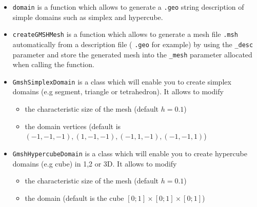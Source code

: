 \begin{itemize}
\item \lstinline!domain! is a function which allows to generate a \verb|.geo|
  string description of simple domains such as simplex and hypercube.

\item \lstinline!createGMSHMesh! is a function which allows to generate a mesh
  file \verb|.msh| automatically from a description file ( \verb|.geo| for
  example) by using the \verb|_desc| parameter and store the generated mesh into
  the \verb|_mesh| parameter allocated when calling the function.

\item \lstinline!GmshSimplexDomain! is a class which will enable you to create
  simplex domains (e.g segment, triangle or tetrahedron). It allows to modify
  	\begin{itemize}
	 \item the characteristic size of the mesh (default $h=0.1$)
  	\item the domain vertices (default is $(-1,-1,-1), (1,-1,-1), (-1,1,-1), (-1,-1,1)$)
  	\end{itemize}

\item \lstinline!GmshHypercubeDomain! is a class which will enable you to create hypercube domains (e.g cube) in 1,2 or 3D. It allows to modify
  	\begin{itemize}
  	\item the characteristic size of the mesh (default $h=0.1$)
  	\item the domain (default is the cube $[0;1]\times[0;1]\times[0;1]$)
  	\end{itemize}
\end{itemize}


